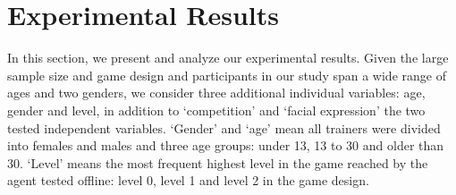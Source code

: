 

\section{Experimental Results}
\label{sec:re}

In this section, we present and analyze our experimental results. Given the large sample size and game design and participants in our study span a wide range of ages and two genders, we consider three additional individual variables: age, gender and level, in addition to `competition' and `facial expression' the two tested independent variables. %
`Gender' and `age' mean all trainers were divided into females and males and three age groups: under 13, 13 to 30 and older than 30. %
`Level' means the most frequent highest level in the game reached by the agent tested offline: level 0, level 1 and level 2 in the game design. 

